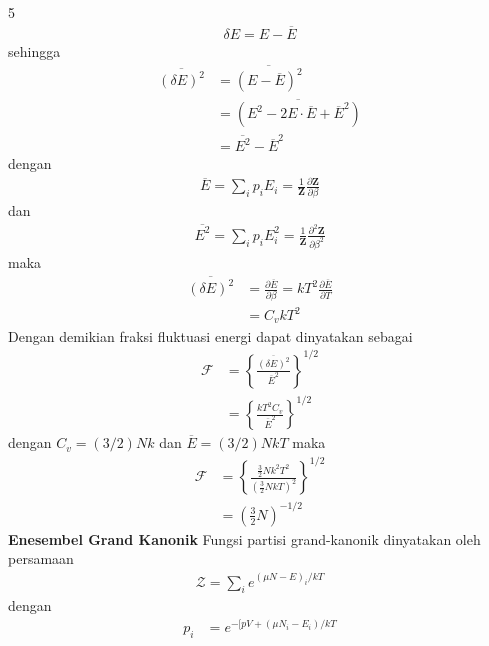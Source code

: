 \documentclass[a4paper  , 6 pt]{article}
\begin{document}
\begin{tiny}
\begin{multicols} {5}
\begin{align}
\delta E = E - \overline{ E} 
\end{align}
sehingga 
\begin{align}
\overline{(\delta E)^2 } &= \overline{(E - \overline{E} )^2 }\nonumber \\
& = \overline{( E^2 - 2 E \cdot \overline{E} + \overline{E}^2) } \nonumber \\
& = \overline{E^2} - \overline{E}^2 
\end{align}
dengan 
\begin{align}
\overline{E} = \sum_i p_i E_i  =  \frac{1}{\boldsymbol{Z}} \frac{\partial \boldsymbol{Z}}{\partial \beta} 
\end{align}
dan 
\begin{align}
\overline{ E^2} = \sum_i p_i E_i^2  = \frac{1}{\boldsymbol{Z}} \frac{\partial^2 \boldsymbol{Z}}{\partial \beta^2} 
\end{align}
maka 
\begin{align}
\overline{(\delta E)^2}& = \frac{\partial \overline{E}}{\partial \beta } = kT^2\frac{\partial \overline{E}}{\partial T} \nonumber \\
& = C_v k T^2  
\end{align}
Dengan demikian fraksi fluktuasi energi dapat dinyatakan sebagai
\begin{align}
\mathcal{F} & = \left \lbrace \frac{\overline{(\delta E)^2}}{\overline{E}^2} \right \rbrace^{1/2} \nonumber \\
& = \left \lbrace \frac{kT^2 C_v }{\overline{E}^2}\right \rbrace^{1/2}
\end{align}
dengan $C_v = (3/2) Nk$ dan $\overline{E} = (3/2)NkT$ maka 
\begin{align}
\mathcal{F} &= \left \lbrace \frac{\frac{3}{2} N k^2 T^2 }{\left( \frac{3}{2} Nk T\right)^2} \right \rbrace^{1/2} \nonumber \\
& = \left( \frac{3}{2} N\right)^{- 1/2 }
\end{align}
\newline
\textbf{Enesembel Grand Kanonik}\newline
Fungsi partisi grand-kanonik dinyatakan oleh persamaan 
\begin{align}
\boldsymbol{\mathcal{Z} }= \sum_i e^{(\mu N - E)_i / kT }  \label{partisi grand kanonik}
\end{align}
dengan 
\begin{align}
p_i &=  e^{-[ pV + (\mu N_i - E_i )/k T}
 \label{peluang grand kanonik}
\end{align}

\end{multicols}
\end{tiny}
\end{document}
